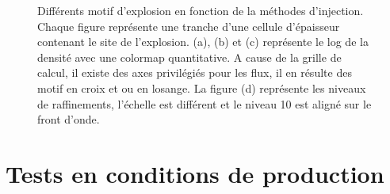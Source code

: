 \begin{figure}

    \caption[Test de Sedov - Tranches]{Différents motif d'explosion en fonction de la méthodes d'injection.
    Chaque figure représente une tranche d'une cellule d'épaisseur contenant le site de l'explosion.
    (a), (b) et (c) représente le log de la densité avec une colormap quantitative.
    A cause de la grille de calcul, il existe des axes privilégiés pour les flux, il en résulte des motif en croix et ou en losange.
    La figure (d) représente les niveaux de raffinements, l'échelle est différent et le niveau 10 est aligné sur le front d'onde.
    }
 	\label{fig:sedovslice}
\end{figure}

%

\section{Tests en conditions de production}


